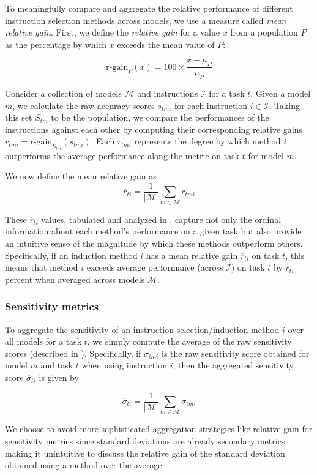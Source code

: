 To meaningfully compare and aggregate the relative performance of different instruction selection methods across models, we use a measure called \textit{mean relative gain}. First, we define the \textit{relative gain} for a value $x$ from a population $P$ as the percentage by which $x$ exceeds the mean value of $P$:

$$\text{r-gain}_P(x) = 100 \times \dfrac{x-\mu_P}{\mu_P}$$

Consider a collection of models $\mathcal{M}$ and instructions $\mathcal{I}$ for a task $t$. Given a model $m$, we calculate the raw accuracy scores $s_{tmi}$ for each instruction $i \in \mathcal{I}$. Taking this set $S_{tm}$ to be the population, we compare the performances of the instructions against each other by computing their corresponding relative gains $r_{tmi} = \text{r-gain}_{S_{tm}}(s_{tmi})$. Each $r_{tmi}$ represents the degree by which method $i$ outperforms the average performance along the metric on task $t$ for model $m$.

We now define the mean relative gain as 
$$\overline{r}_{ti} = \dfrac{1}{|\mathcal{M}|} \sum_{m \in \mathcal{M}} r_{tmi}$$

These $\overline{r}_{ti}$ values, tabulated and analyzed in , capture not only the ordinal information about each method's performance on a given task but also provide an intuitive sense of the magnitude by which these methods outperform others. Specifically, if an induction method $i$ has a mean relative gain $\overline{r}_{ti}$ on task $t$, this means that method $i$ exceeds average performance (across $\mathcal{I}$) on task $t$ by $\overline{r}_{ti}$ percent when averaged across models $\mathcal{M}$. 

\subsubsection{Sensitivity metrics}
To aggregate the sensitivity of an instruction selection/induction method $i$ over all models for a task $t$, we simply compute the average of the raw sensitivity scores (described in ). Specifically, if $\sigma_{tmi}$ is the raw sensitivity score obtained for model $m$ and task $t$ when using instruction $i$, then the aggregated sensitivity score $\overline{\sigma}_{ti}$ is given by 

$$\overline{\sigma}_{ti} = \dfrac{1}{|\mathcal{M}|} \sum_{m \in \mathcal{M}} \sigma_{tmi}$$

We choose to avoid more sophisticated aggregation strategies like relative gain for sensitivity metrics since standard deviations are already secondary metrics making it unintuitive to discuss the relative gain of the standard deviation obtained using a method over the average. %

